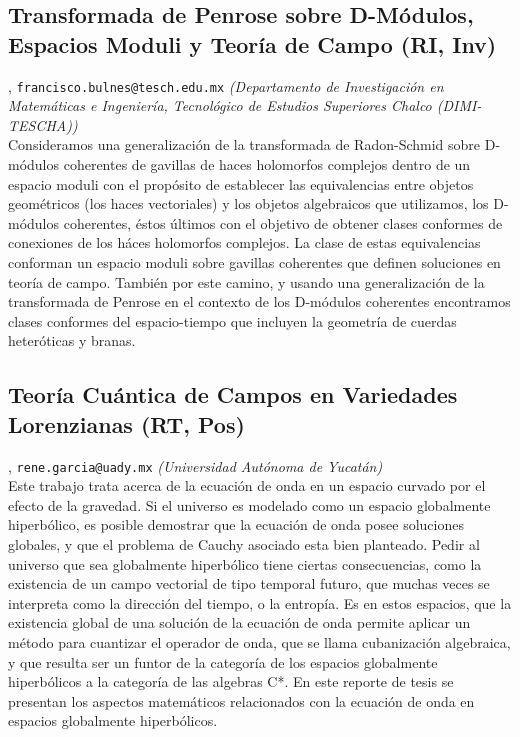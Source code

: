 \subsection{\sffamily Transformada de Penrose sobre D-M\'odulos, Espacios Moduli y Teor\'ia de Campo {\footnotesize (RI, Inv)}} \label{reg-308} 
, {\tt francisco.bulnes@tesch.edu.mx}  {\slshape (Departamento de Investigaci\'on en Matem\'aticas e Ingenier\'ia, Tecnol\'ogico de Estudios Superiores Chalco (DIMI-TESCHA))}\\
          \noindent  Consideramos una generalizaci\'on de la transformada de Radon-Schmid sobre D-m\'odulos coherentes de gavillas de haces holomorfos complejos dentro de un espacio moduli con el prop\'osito de establecer las equivalencias entre objetos geom\'etricos (los haces vectoriales) y los objetos algebraicos que utilizamos, los D-m\'odulos coherentes, \'estos \'ultimos con el objetivo de obtener clases conformes de conexiones de los h\'aces holomorfos complejos. La clase de estas equivalencias conforman un espacio moduli sobre gavillas coherentes que definen soluciones en teor\'ia de campo. Tambi\'en por este camino, y usando una generalizaci\'on de la transformada de Penrose en el contexto de los D-m\'odulos coherentes encontramos clases conformes del espacio-tiempo que incluyen la geometr\'ia de cuerdas heter\'oticas y branas.
\subsection{\sffamily Teor\'ia Cu\'antica de Campos en Variedades Lorenzianas {\footnotesize (RT, Pos)}} \label{reg-403} 
, {\tt rene.garcia@uady.mx}  {\slshape (Universidad Aut\'onoma de Yucat\'an)}\\
          \noindent Este trabajo trata acerca de la ecuaci\'on de onda en un espacio curvado por el efecto de la gravedad. Si el universo es modelado como un espacio globalmente hiperb\'olico, es posible demostrar que la ecuaci\'on de onda posee soluciones globales, y que el problema de Cauchy asociado esta bien planteado. Pedir al universo que sea globalmente hiperb\'olico tiene ciertas consecuencias, como la existencia de un campo vectorial de tipo temporal futuro, que muchas veces se interpreta como la direcci\'on del tiempo, o la entrop\'ia. Es en estos espacios, que la existencia global de una soluci\'on de la ecuaci\'on de onda permite aplicar un m\'etodo para cuantizar el operador de onda, que se llama cubanizaci\'on algebraica, y que resulta ser un funtor de la categor\'ia de los espacios globalmente hiperb\'olicos a la categor\'ia de las algebras C*. En este reporte de tesis se presentan los aspectos matem\'aticos relacionados con la ecuaci\'on de onda en espacios globalmente hiperb\'olicos.

